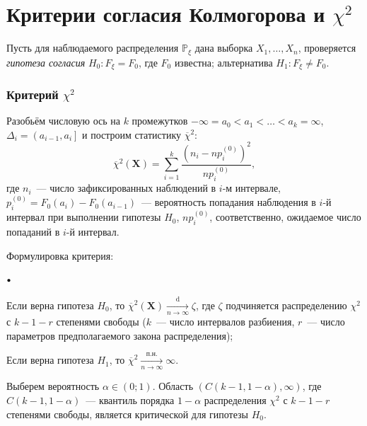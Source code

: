 \documentclass[oneside,final,14pt]{extreport}
\theoremstyle{plain}
\theoremstyle{definition}
\theoremstyle{named}
\newcommand\sbullet[1][.5]{\mathbin{\vcenter{\hbox{\scalebox{#1}{$\bullet$}}}}}
\newenvironment{compactlist}{
\begin{list}{{$\sbullet[.75]$}}{
\setlength\partopsep{0pt}
\setlength\parskip{0pt}
\setlength\parsep{0pt}
\setlength\topsep{0pt}
\setlength\itemsep{0pt}
}
}{
\end{list}
}
\begin{document}
\section{Критерии согласия Колмогорова и $\chi^{2}$}

Пусть для наблюдаемого распределения $\mathbb{P}_{\xi}$ дана выборка $X_1, \ldots, X_n$, проверяется {\it гипотеза согласия} $H_{0}: F_{\xi}=F_{0}$, где $F_{0}$ известна; альтернатива $H_{1}: F_{\xi} \neq F_{0}$.

\subsubsection{Критерий $\chi^{2}$}
Разобьём числовую ось на $k$ промежутков ${-\infty=a_{0}<a_{1}<\ldots<a_{k}=\infty}$, ${\Delta_{i}=\left(a_{i-1}, a_{i}\right]}$ и построим статистику $\overline{\chi}^{2}$:
\begin{equation*}
    \overline{\chi}^{2}(\mathbf{X})=\sum_{i=1}^{k} \frac{\left(n_{i}-n p_{i}^{(0)}\right)^{2}}{n p_{i}^{(0)}},
\end{equation*}
где $n_i$~--- число зафиксированных наблюдений в $i$-м интервале,
$p_{i}^{(0)}=F_{0}\left(a_{i}\right)-F_{0}\left(a_{i-1}\right)$~--- вероятность попадания наблюдения в $i$-й интервал при выполнении гипотезы $H_0$, $n p_{i}^{(0)}$, соответственно, ожидаемое число попаданий в $i$-й интервал.

Формулировка критерия:
\begin{compactlist}
    \item Если верна гипотеза $H_0$, то $\overline{\chi}^{2}\left(\mathbf{X}\right) \xrightarrow[n \to \infty]{\text{d}} \zeta$, где $\zeta$ подчиняется распределению $\chi^{2}$ с $k-1-r$ степенями свободы ($k$~--- число интервалов разбиения, $r$~--- число параметров предполагаемого закона распределения);
    \item Если верна гипотеза $H_1$, то $\overline{\chi}^{2} \xrightarrow[n \to \infty]{\text{п.н.}} \infty$.
\end{compactlist}

Выберем вероятность $\alpha \in (0;1)$. Область $(C(k-1,1-\alpha), \infty)$, где $C(k-1,1-\alpha)$~--- квантиль порядка $1-\alpha$ распределения $\chi^{2}$ с $k-1-r$ степенями свободы, является критической для гипотезы $H_0$.
\end{document}
